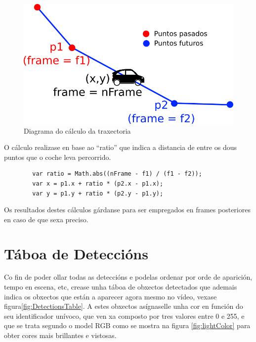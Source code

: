     \begin{figure}[htp]
    \begin{center}
        \includegraphics[scale=0.4]{figures/calcTrajectory.png}
        \caption{Diagrama do cálculo da traxectoria}
    \label{fig:calcTrajectory}
    \end{center}
    \end{figure}
    
    O cálculo realizase en base ao ``ratio'' que indica a distancia de entre os dous puntos que o coche 
    leva percorrido.
    
    \begin{verbatim}
        var ratio = Math.abs((nFrame - f1) / (f1 - f2));
        var x = p1.x + ratio * (p2.x - p1.x);
        var y = p1.y + ratio * (p2.y - p1.y);    
    \end{verbatim}
    
    Os resultados destes cálculos gárdanse para ser empregados en frames posteriores en caso de que
    sexa preciso.

\section{Táboa de Deteccións}

    Co fin de poder ollar todas as deteccións e podelas ordenar por orde de aparición, tempo en 
    escena, etc, crease unha táboa de obxectos detectados que ademais indica os obxectos que están
    a aparecer agora mesmo no vídeo, vexase figura\ref{fig:DetectionsTable}.
    A estes obxectos asígnaselle unha cor en función do seu 
    identificador unívoco, que ven xa composto por tres valores entre 0 e 255, e que se trata 
    segundo o model RGB como se mostra na figura \ref{fig:lightColor} para obter cores mais 
    brillantes e vistosas.
    
